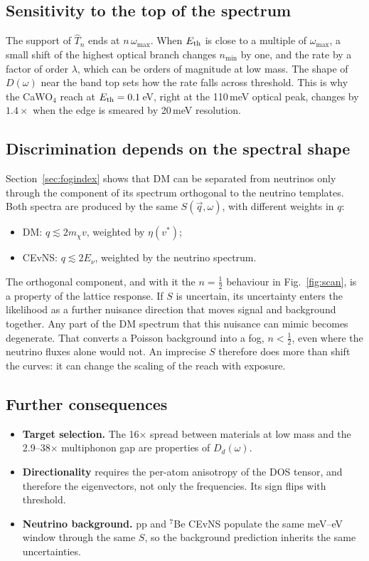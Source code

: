 \documentclass[11pt,a4paper]{article}
\numberwithin{equation}{section}
\newcommand{\qv}{\vec q}
\newcommand{\Eth}{E_{\rm th}}
\newcommand{\mchi}{m_\chi}
\begin{document}
\subsection{Sensitivity to the top of the spectrum}
The support of $\hat T_n$ ends at $n\,\omega_{\max}$. When $\Eth$ is close to a multiple of
$\omega_{\max}$, a small shift of the highest optical branch changes $n_{\min}$ by one, and the
rate by a factor of order $\lambda$, which can be orders of magnitude at low mass. The shape of
$D(\omega)$ near the band top sets how the rate falls across threshold. This is why the
CaWO$_4$ reach at $\Eth=0.1$\,eV, right at the 110\,meV optical peak, changes by $1.4\times$
when the edge is smeared by 20\,meV resolution.

\subsection{Discrimination depends on the spectral shape}
Section~\ref{sec:fogindex} shows that DM can be separated from neutrinos only through the
component of its spectrum orthogonal to the neutrino templates. Both spectra are produced by
the same $S(\qv,\omega)$, with different weights in $q$:
\begin{itemize}
  \item DM: $q\lesssim2\mchi v$, weighted by $\eta(v^*)$;
  \item CEvNS: $q\lesssim2E_\nu$, weighted by the neutrino spectrum.
\end{itemize}
The orthogonal component, and with it the $n=\frac12$ behaviour in Fig.~\ref{fig:scan}, is a
property of the lattice response. If $S$ is uncertain, its uncertainty enters the likelihood
as a further nuisance direction that moves signal and background together. Any part of the DM
spectrum that this nuisance can mimic becomes degenerate. That converts a Poisson background
into a fog, $n<\frac12$, even where the neutrino fluxes alone would not. An imprecise $S$
therefore does more than shift the curves: it can change the scaling of the reach with
exposure.

\subsection{Further consequences}
\begin{itemize}
  \item \textbf{Target selection.} The 16$\times$ spread between materials at low mass and the
  2.9--38$\times$ multiphonon gap are properties of $D_d(\omega)$.
  \item \textbf{Directionality} requires the per-atom anisotropy of the DOS tensor, and
  therefore the eigenvectors, not only the frequencies. Its sign flips with threshold.
  \item \textbf{Neutrino background.} pp and $^7$Be CEvNS populate the same meV--eV window
  through the same $S$, so the background prediction inherits the same uncertainties.
\end{itemize}
\end{document}
